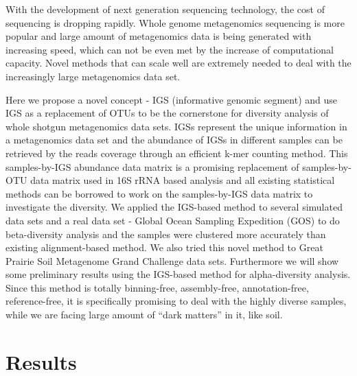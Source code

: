 \documentclass{article}
\begin{document}
With the development of next generation sequencing technology, the cost of sequencing is dropping rapidly. 
Whole genome metagenomics sequencing is more popular and large amount of metagenomics data is 
being generated with increasing speed, which can not be even met by the increase of computational capacity.
Novel methods that can scale well are extremely needed to deal with the increasingly large metagenomics data
set. 


%
%
%
%
%
%
%
%
%
%
%
%
%
%
%
%
%
%
%
%
%
%


Here we propose a novel concept - IGS (informative genomic 
segment) and use IGS as a replacement of OTUs to be the cornerstone for 
diversity analysis of whole shotgun metagenomics data sets. IGSs represent the 
unique information in a metagenomics data set and the abundance of IGSs in 
different samples can be retrieved by the reads coverage through an efficient 
k-mer counting method. This samples-by-IGS abundance data matrix is a promising
replacement of samples-by-OTU data matrix used in 16S rRNA based analysis and 
all existing statistical methods can be borrowed to work on the samples-by-IGS 
data matrix to investigate the diversity. We applied the IGS-based method to 
several simulated data sets and a real data set - Global Ocean Sampling 
Expedition (GOS) to do beta-diversity analysis and the samples were clustered 
more accurately than existing alignment-based method. We also tried this novel 
method to Great Prairie Soil Metagenome Grand Challenge data sets. Furthermore 
we will show some preliminary results using the IGS-based method for 
alpha-diversity analysis. Since this method is totally binning-free, 
assembly-free, annotation-free, reference-free, it is specifically promising 
to deal with the highly diverse samples, while we are facing large amount of 
“dark matters” in it, like soil.






\section{Results}
\end{document}
